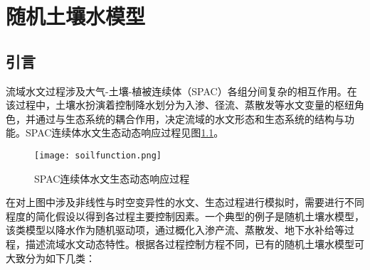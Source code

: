 

\chapter{随机土壤水模型}
\label{cha:china}
\section{引言}
流域水文过程涉及大气-土壤-植被连续体（SPAC）各组分间复杂的相互作用。在该过程中，土壤水扮演着控制降水划分为入渗、径流、蒸散发等水文变量的枢纽角色，并通过与生态系统的耦合作用，决定流域的水文形态和生态系统的结构与功能。SPAC连续体水文生态动态响应过程见图\ref{soilfunction}。
\begin{figure}[H]
\centering
\texttt{[image: soilfunction.png]}
\caption{SPAC连续体水文生态动态响应过程\cite{rodriguez2001plants}}
\label{soilfunction}
\end{figure}

在对上图中涉及非线性与时空变异性的水文、生态过程\cite{clark2001ecological}进行模拟时，需要进行不同程度的简化假设以得到各过程主要控制因素\cite{porporato2002ecohydrology}。一个典型的例子是随机土壤水模型，该类模型以降水作为随机驱动项，通过概化入渗产流、蒸散发、地下水补给等过程，描述流域水文动态特性。根据各过程控制方程不同，已有的随机土壤水模型可大致分为如下几类：

\begin{table}[H] 
\caption{随机土壤水模型}
\label{ssmm}
\end{table}

